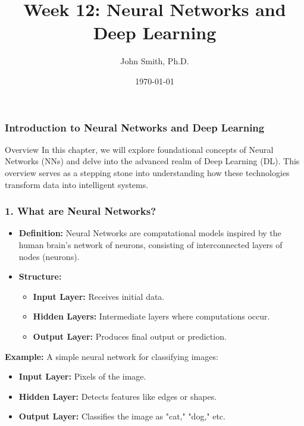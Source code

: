 \documentclass[aspectratio=169]{beamer}
\title[Week 12: Neural Networks and Deep Learning]{Week 12: Neural Networks and Deep Learning}
\author[J. Smith]{John Smith, Ph.D.}
\institute[University Name]{
  Department of Computer Science\\
  University Name\\
  \vspace{0.3cm}
  Email: email@university.edu\\
  Website: www.university.edu
}
\date{\today}
\begin{document}
\frame{\titlepage}

\begin{frame}[fragile]
    \titlepage
\end{frame}

\begin{frame}[fragile]
    \frametitle{Introduction to Neural Networks and Deep Learning}
    \begin{block}{Overview}
        In this chapter, we will explore foundational concepts of Neural Networks (NNs) and delve into the advanced realm of Deep Learning (DL). This overview serves as a stepping stone into understanding how these technologies transform data into intelligent systems.
    \end{block}
\end{frame}

\begin{frame}[fragile]
    \frametitle{1. What are Neural Networks?}
    \begin{itemize}
        \item \textbf{Definition:} Neural Networks are computational models inspired by the human brain's network of neurons, consisting of interconnected layers of nodes (neurons).
        \item \textbf{Structure:}
        \begin{itemize}
            \item \textbf{Input Layer:} Receives initial data.
            \item \textbf{Hidden Layers:} Intermediate layers where computations occur.
            \item \textbf{Output Layer:} Produces final output or prediction.
        \end{itemize}
    \end{itemize}
    \textbf{Example:} A simple neural network for classifying images:
    \begin{itemize}
        \item \textbf{Input Layer:} Pixels of the image.
        \item \textbf{Hidden Layer:} Detects features like edges or shapes.
        \item \textbf{Output Layer:} Classifies the image as "cat," "dog," etc.
    \end{itemize}
\end{frame}
\end{document}
